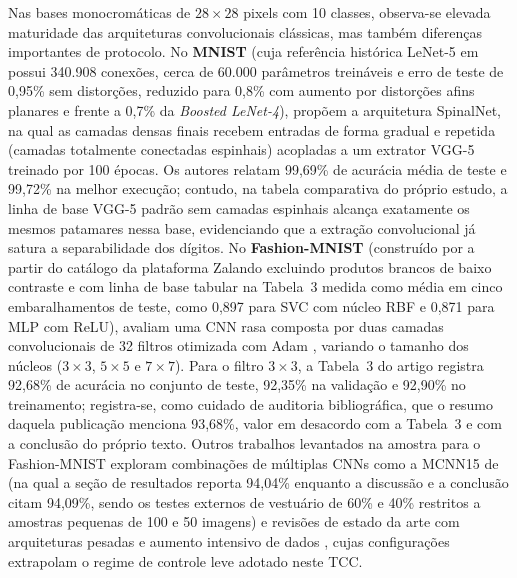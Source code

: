 \documentclass[
    12pt,
    openright,
    oneside,
    a4paper,
    english,
    brazil
]{abntex2}
\begin{document}
Nas bases monocromáticas de \(28 \times 28\) pixels com 10 classes, observa-se elevada maturidade das arquiteturas convolucionais clássicas, mas também diferenças importantes de protocolo. No \textbf{MNIST} (cuja referência histórica LeNet-5 em  possui 340.908 conexões, cerca de 60.000 parâmetros treináveis e erro de teste de 0,95\% sem distorções, reduzido para 0,8\% com aumento por distorções afins planares e frente a 0,7\% da \textit{Boosted LeNet-4}),  propõem a arquitetura SpinalNet, na qual as camadas densas finais recebem entradas de forma gradual e repetida (camadas totalmente conectadas espinhais) acopladas a um extrator VGG-5 \cite{simonyan2015vgg} treinado por 100 épocas. Os autores relatam 99,69\% de acurácia média de teste e 99,72\% na melhor execução; contudo, na tabela comparativa do próprio estudo, a linha de base VGG-5 padrão sem camadas espinhais alcança exatamente os mesmos patamares nessa base, evidenciando que a extração convolucional já satura a separabilidade dos dígitos. No \textbf{Fashion-MNIST} (construído por  a partir do catálogo da plataforma Zalando excluindo produtos brancos de baixo contraste e com linha de base tabular na Tabela~3 medida como média em cinco embaralhamentos de teste, como 0,897 para SVC com núcleo RBF e 0,871 para MLP com ReLU),  avaliam uma CNN rasa composta por duas camadas convolucionais de 32 filtros otimizada com Adam \cite{kingma2015adam}, variando o tamanho dos núcleos (\(3 \times 3\), \(5 \times 5\) e \(7 \times 7\)). Para o filtro \(3 \times 3\), a Tabela~3 do artigo registra 92,68\% de acurácia no conjunto de teste, 92,35\% na validação e 92,90\% no treinamento; registra-se, como cuidado de auditoria bibliográfica, que o resumo daquela publicação menciona 93,68\%, valor em desacordo com a Tabela~3 e com a conclusão do próprio texto. Outros trabalhos levantados na amostra para o Fashion-MNIST exploram combinações de múltiplas CNNs como a MCNN15 de  (na qual a seção de resultados reporta 94,04\% enquanto a discussão e a conclusão citam 94,09\%, sendo os testes externos de vestuário de 60\% e 40\% restritos a amostras pequenas de 100 e 50 imagens) e revisões de estado da arte com arquiteturas pesadas e aumento intensivo de dados \cite{mukhamediev2024fashionmnist}, cujas configurações extrapolam o regime de controle leve adotado neste TCC.
\end{document}
